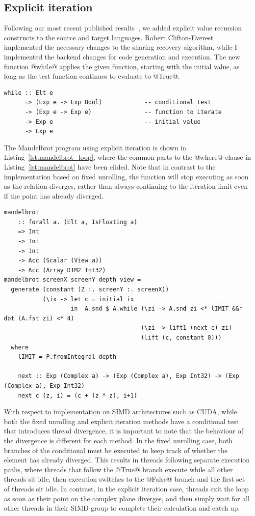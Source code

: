 \subsection{Explicit iteration}

Following our most recent published results~\cite{McDonell:2013wi}, we added
explicit value recursion constructs to the source and target languages. Robert
Clifton-Everest implemented the necessary changes to the sharing recovery
algorithm, while I implemented the backend changes for code generation and
execution. The new function @while@ applies the given function, starting with
the initial value, as long as the test function continues to evaluate to @True@.
%
\begin{lstlisting}[style=haskell]
while :: Elt e
      => (Exp e -> Exp Bool)            -- conditional test
      -> (Exp e -> Exp e)               -- function to iterate
      -> Exp e                          -- initial value
      -> Exp e
\end{lstlisting}
%
The Mandelbrot program using explicit iteration is shown in
Listing~\ref{lst:mandelbrot_loop}, where the common parts to the @where@ clause
in Listing~\ref{lst:mandelbrot} have been elided. Note that in contrast to the
implementation based on fixed unrolling, the function will stop executing as
soon as the relation diverges, rather than always continuing to the iteration
limit even if the point has already diverged.

\begin{lstlisting}[style=haskell_float
    ,label=lst:mandelbrot_loop
    ,caption={Mandelbrot set generator, using explict iteration}]
mandelbrot
    :: forall a. (Elt a, IsFloating a)
    => Int
    -> Int
    -> Int
    -> Acc (Scalar (View a))
    -> Acc (Array DIM2 Int32)
mandelbrot screenX screenY depth view =
  generate (constant (Z :. screenY :. screenX))
           (\ix -> let c = initial ix
                   in  A.snd $ A.while (\zi -> A.snd zi <* lIMIT &&* dot (A.fst zi) <* 4)
                                       (\zi -> lift1 (next c) zi)
                                       (lift (c, constant 0)))
  where
    lIMIT = P.fromIntegral depth

    next :: Exp (Complex a) -> (Exp (Complex a), Exp Int32) -> (Exp (Complex a), Exp Int32)
    next c (z, i) = (c + (z * z), i+1)
\end{lstlisting}

With respect to implementation on SIMD architectures such as CUDA, while both
the fixed unrolling and explicit iteration methods have a conditional test that
introduces thread divergence, it is important to note that the behaviour of the
divergence is different for each method. In the fixed unrolling case, both
branches of the conditional must be executed to keep track of whether the
element has already diverged. This results in threads following separate
execution paths, where threads that follow the @True@ branch execute while all
other threads sit idle, then execution switches to the @False@ branch and the
first set of threads sit idle. In contrast, in the explicit iteration case,
threads exit the loop as soon as their point on the complex plane diverges, and
then simply wait for all other threads in their SIMD group to complete their
calculation and catch up.

